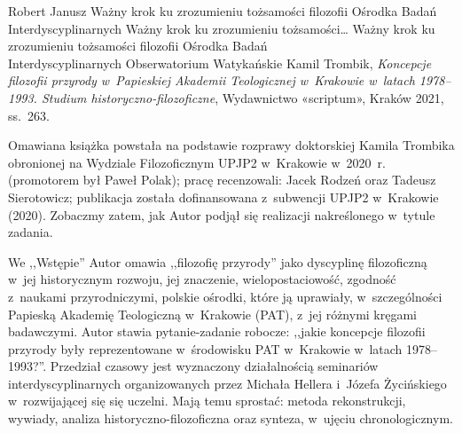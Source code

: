 \begin{newrevplenv}{Robert Janusz}
	{Ważny krok ku zrozumieniu tożsamości filozofii Ośrodka Badań Interdyscyplinarnych}
	{Ważny krok ku zrozumieniu tożsamości\ldots}
	{Ważny krok ku zrozumieniu tożsamości filozofii Ośrodka Badań\\
	Interdyscyplinarnych}
	{Obserwatorium Watykańskie}
	{Kamil Trombik, \textit{Koncepcje filozofii przyrody w~Papieskiej Akademii Teologicznej w~Krakowie w~latach 1978--1993. Studium historyczno-filozoficzne}, Wydawnictwo «scriptum», Kraków 2021, ss.~263.}

\lettrine[loversize=0.13,lines=2,lraise=-0.03,nindent=0em,findent=0.2pt]%
{O}{}mawiana książka powstała na podstawie rozprawy doktorskiej Kamila Trombika obronionej na Wydziale Filozoficznym UPJP2 w~Krakowie w~2020~r. (promotorem był Paweł Polak); pracę recenzowali: Jacek Rodzeń oraz Tadeusz Sierotowicz; publikacja została dofinansowana z~subwencji UPJP2 w~Krakowie (2020).
Zobaczmy zatem, jak Autor podjął się realizacji nakreślonego w~tytule zadania.

We ,,Wstępie'' Autor omawia ,,filozofię przyrody'' jako dyscyplinę filozoficzną w~jej historycznym rozwoju, jej znaczenie, wielopostaciowość, zgodność z~naukami przyrodniczymi, polskie ośrodki, które ją uprawiały, w~szczególności Papieską Akademię Teologiczną w~Krakowie (PAT), z~jej różnymi kręgami badawczymi. Autor stawia pytanie-zadanie robocze: ,,jakie koncepcje filozofii przyrody były reprezentowane w~środowisku PAT w~Krakowie w~latach 1978--1993?''. Przedział czasowy jest wyznaczony działalnością seminariów interdyscyplinarnych organizowanych przez Michała Hellera i~Józefa Życińskiego w~rozwijającej się się uczelni. Mają temu sprostać: metoda rekonstrukcji, wywiady, analiza historyczno-filozoficzna oraz synteza, w~ujęciu chronologicznym.


\end{newrevplenv}
